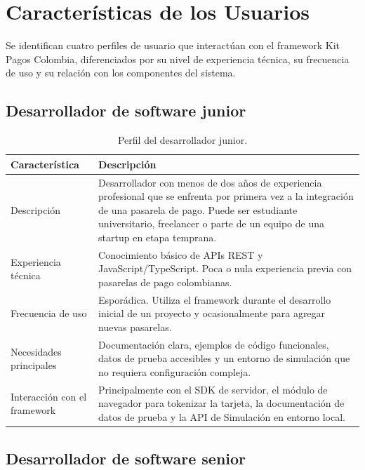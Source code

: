 \section{Características de los Usuarios}

Se identifican cuatro perfiles de usuario que interactúan con el framework Kit Pagos Colombia, diferenciados por su nivel de experiencia técnica, su frecuencia de uso y su relación con los componentes del sistema.

\subsection{Desarrollador de software junior}

\begin{table}[H]
  \centering
  \renewcommand{\arraystretch}{1.2}
  \begin{tabularx}{\textwidth}{|l|X|}
    \hline
    \textbf{Característica} & \textbf{Descripción} \\
    \hline
    Descripción & Desarrollador con menos de dos años de experiencia profesional que se enfrenta por primera vez a la integración de una pasarela de pago. Puede ser estudiante universitario, freelancer o parte de un equipo de una startup en etapa temprana. \\
    \hline
    Experiencia técnica & Conocimiento básico de APIs REST y JavaScript/TypeScript. Poca o nula experiencia previa con pasarelas de pago colombianas. \\
    \hline
    Frecuencia de uso & Esporádica. Utiliza el framework durante el desarrollo inicial de un proyecto y ocasionalmente para agregar nuevas pasarelas. \\
    \hline
    Necesidades principales & Documentación clara, ejemplos de código funcionales, datos de prueba accesibles y un entorno de simulación que no requiera configuración compleja. \\
    \hline
    Interacción con el framework & Principalmente con el SDK de servidor, el módulo de navegador para tokenizar la tarjeta, la documentación de datos de prueba y la API de Simulación en entorno local. \\
    \hline
  \end{tabularx}
  \caption{Perfil del desarrollador junior.}
  \label{tab:perfil-junior}
\end{table}

\subsection{Desarrollador de software senior}

